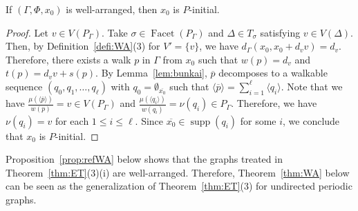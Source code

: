 \documentclass[ALCO,published]{cedram}
\theoremstyle{remark}
\begin{document}
\begin{lem}\label{lem:WAPI}
If $(\Gamma, \Phi, x_0)$ is well-arranged, then $x_0$ is $P$-initial. 
\end{lem}
\begin{proof}
Let $v \in V(P_{\Gamma})$. 
Take $\sigma \in \operatorname{Facet}(P_{\Gamma})$ and $\Delta \in T_{\sigma}$ satisfying $v \in V(\Delta)$. 
Then, by Definition~\ref{defi:WA}(3) for $V' = \{ v \}$, we have $d_{\Gamma}(x_0, x_0 + d_v v) = d_v$. 
Therefore, there exists a walk $p$ in $\Gamma$ from $x_0$ such that $w(p) = d_v$ and 
$t(p) = d_v v + s(p)$. 
By Lemma~\ref{lem:bunkai}, $\overline{p}$ decomposes to a walkable sequence $(q_0, q_1, \ldots , q_{\ell})$ with $q_0 = \emptyset _{\overline{x_0}}$ such that 
$\langle \overline{p} \rangle = \sum _{i = 1} ^{\ell} \langle q_i \rangle$. 
Note that we have 
$\frac{\mu(\langle \overline{p} \rangle)}{w(p)} = v \in V(P_{\Gamma})$ and 
$\frac{\mu(\langle q_i \rangle)}{w(q_i)} = \nu(q_i) \in P_{\Gamma}$. 
Therefore, we have $\nu(q_i) = v$ for each $1 \le i \le \ell$. 
Since $\overline{x_0} \in \operatorname{supp}(q_i)$ for some $i$, we conclude that $x_0$ is $P$-initial. 
\end{proof}

Proposition~\ref{prop:refWA} below shows that the graphs treated in Theorem~\ref{thm:ET}(3)(i) are well-arranged. 
Therefore, Theorem~\ref{thm:WA} below can be seen as the generalization of 
Theorem~\ref{thm:ET}(3) for undirected periodic graphs. 
\end{document}
